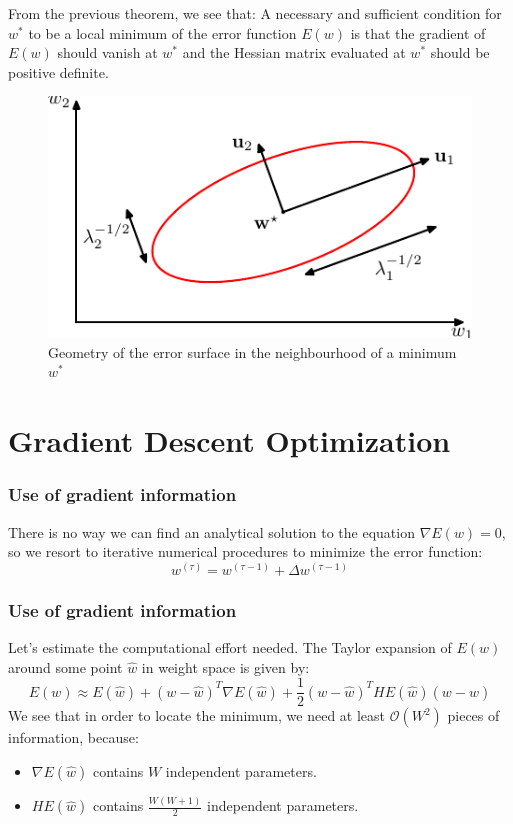\documentclass{beamer}
\begin{document}
\begin{frame}
    From the previous theorem, we see that: A necessary and sufficient condition for $w^{*}$ to be a local minimum of the error function $E(w)$ is that the gradient of $E(w)$ should vanish at $w^{*}$ and the Hessian matrix evaluated at $w^{*}$ should be positive definite.
    \begin{figure}
        \caption{Geometry of the error surface in the neighbourhood of a minimum $w^{*}$}
        \includegraphics{Figure_2.pdf}
    \end{figure}
\end{frame}

\section{Gradient Descent Optimization}

\begin{frame}
    \frametitle{Use of gradient information}
    There is no way we can find an analytical solution to the equation $\nabla{}E(w)=0$, so we resort to iterative numerical procedures to minimize the error function:
    \begin{equation*}
        w^{(\tau)}=w^{(\tau-1)}+\Delta{}w^{(\tau-1)}
    \end{equation*}
\end{frame}

\begin{frame}
    \frametitle{Use of gradient information}
    Let's estimate the computational effort needed. The Taylor expansion of $E(w)$ around some point $\hat{w}$ in weight space is given by:
    \begin{equation*}
        E(w)\approx{}E(\hat{w})+(w-\hat{w})^{T}\nabla{}E(\hat{w})+\frac{1}{2}(w-\hat{w})^{T}HE(\hat{w})(w-\hat{w})
    \end{equation*}
    We see that in order to locate the minimum, we need at least $\mathcal{O}(W^{2})$ pieces of information, because:
    \begin{itemize}
        \item $\nabla{}E(\hat{w})$ contains $W$ independent parameters.
        \item $HE(\hat{w})$ contains $\frac{W(W+1)}{2}$ independent parameters.
    \end{itemize}
\end{frame}
\end{document}
